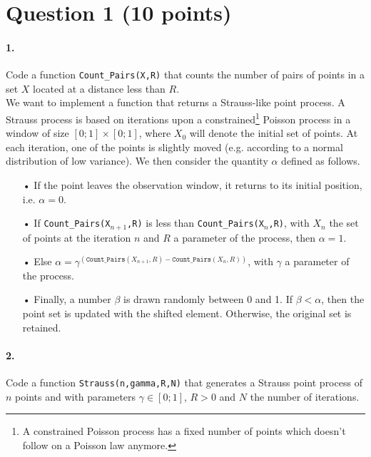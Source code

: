 \documentclass{article}
\begin{document}
\section{Question 1 (10 points)}


\paragraph{1.} Code a function \texttt{Count\_Pairs(X,R)} that counts the number of pairs of points in a set $X$ located at a distance less than $R$.\\

We want to implement a function that returns a Strauss-like point process. A Strauss process is based on iterations upon a constrained\footnote{A constrained Poisson process has a fixed number of points which doesn't follow on a Poisson law anymore.} Poisson process in a window of size $[0;1]\times[0;1]$, where $X_0$ will denote the initial set of points. At each iteration, one of the points is slightly moved (e.g. according to a normal distribution of low variance). We then consider the quantity $\alpha$ defined as follows.

\begin{enumerate}
\item[•] If the point leaves the observation window, it returns to its initial position, i.e. $\alpha=0$.
\item[•] If \texttt{Count\_Pairs(X$_{n+1}$,R)} is less than \texttt{Count\_Pairs(X$_{n}$,R)}, with $X_n$ the set of points at the iteration $n$ and $R$ a parameter of the process, then $\alpha=1$.
\item[•] Else $\alpha =\gamma^{\left(\texttt{Count\_Pairs}(X_{n+1},R)-\texttt{Count\_Pairs}(X_{n},R)\right)}$, with $\gamma$ a parameter of the process.
\item[•] Finally, a number $\beta$ is drawn randomly between 0 and 1. If $\beta<\alpha$, then the point set is updated with the shifted element. Otherwise, the original set is retained.
\end{enumerate}

\paragraph{2.} Code a function \texttt{Strauss(n,gamma,R,N)} that generates a Strauss point process of $n$ points and with parameters $\gamma\in[0;1]$, $R>0$ and $N$ the number of iterations.
\end{document}
